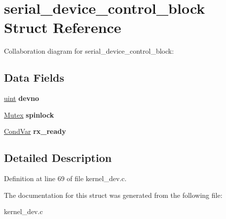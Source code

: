 \hypertarget{structserial__device__control__block}{}\section{serial\+\_\+device\+\_\+control\+\_\+block Struct Reference}
\label{structserial__device__control__block}


Collaboration diagram for serial\+\_\+device\+\_\+control\+\_\+block\+:
\subsection*{Data Fields}
\begin{DoxyCompactItemize}
\item 
\hyperlink{bios_8h_a91ad9478d81a7aaf2593e8d9c3d06a14}{uint} {\bfseries devno}\hypertarget{structserial__device__control__block_a44ef944c9ed235eff02cba42f44487c6}{}\label{structserial__device__control__block_a44ef944c9ed235eff02cba42f44487c6}

\item 
\hyperlink{group__syscalls_gaef2ec62cae8e0031fd19fc8b91083ade}{Mutex} {\bfseries spinlock}\hypertarget{structserial__device__control__block_a8861a6dc00a780bf5641f6945bf276cc}{}\label{structserial__device__control__block_a8861a6dc00a780bf5641f6945bf276cc}

\item 
\hyperlink{structCondVar}{Cond\+Var} {\bfseries rx\+\_\+ready}\hypertarget{structserial__device__control__block_a2b0916cc5b259d64ebe85743ab89b84e}{}\label{structserial__device__control__block_a2b0916cc5b259d64ebe85743ab89b84e}

\end{DoxyCompactItemize}


\subsection{Detailed Description}


Definition at line 69 of file kernel\+\_\+dev.\+c.



The documentation for this struct was generated from the following file\+:\begin{DoxyCompactItemize}
\item 
kernel\+\_\+dev.\+c\end{DoxyCompactItemize}
